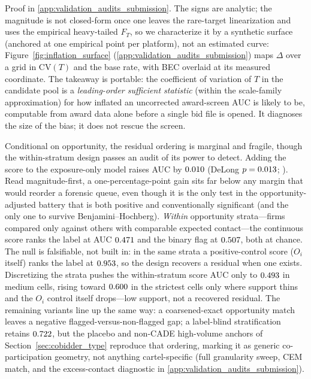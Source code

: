 \noindent Proof in \ref{app:validation_audits_submission}.
The signs are analytic; the magnitude is not closed-form once one
leaves the rare-target linearization and uses the empirical
heavy-tailed $F_T$, so we characterize it by a synthetic surface
(anchored at one empirical point per platform), not an estimated
curve: Figure~\ref{fig:inflation_surface}
(\ref{app:validation_audits_submission}) maps $\Delta$ over
a grid in $\mathrm{CV}(T)$ and the base rate, with BEC overlaid at
its measured coordinate. The takeaway is portable: the coefficient
of variation of $T$ in the candidate pool is a \emph{leading-order
sufficient statistic} (within the scale-family approximation) for
how inflated an uncorrected award-screen AUC is likely to be,
computable from award data alone before a single bid file is opened.
It diagnoses the size of the bias; it does not rescue the screen.

Conditional on opportunity, the residual ordering is marginal and
fragile, though the within-stratum design passes an audit of its
power to detect. Adding the score to the exposure-only model raises
AUC by $0.010$ (DeLong $p=0.013$;
\citealp{delong1988comparing}). Read magnitude-first, a
one-percentage-point gain sits far below any margin that would
reorder a forensic queue, even though it is the only test in the
opportunity-adjusted battery that is both positive and
conventionally significant (and the only one to survive
Benjamini--Hochberg). \emph{Within} opportunity strata---firms
compared only against others with comparable expected contact---the
continuous score ranks the label at AUC $0.471$ and the
binary flag at $0.507$, both at chance. The null is
falsifiable, not built in: in the same strata a positive-control
score ($O_i$ itself) ranks the label at $0.953$,
so the design recovers a residual when one exists. Discretizing the
strata pushes the within-stratum score AUC only to
$0.493$ in medium cells, rising toward
$0.600$ in the strictest cells only where support
thins and the $O_i$ control itself drops---low support, not a
recovered residual. The remaining variants line up the same way: a
coarsened-exact opportunity match leaves a negative
flagged-versus-non-flagged gap; a label-blind stratification retains
$0.722$, but the placebo and non-CADE high-volume
anchors of Section~\ref{sec:cobidder_type} reproduce that ordering,
marking it as generic co-participation geometry, not anything
cartel-specific (full granularity sweep, CEM match, and the
excess-contact diagnostic in
\ref{app:validation_audits_submission}).

